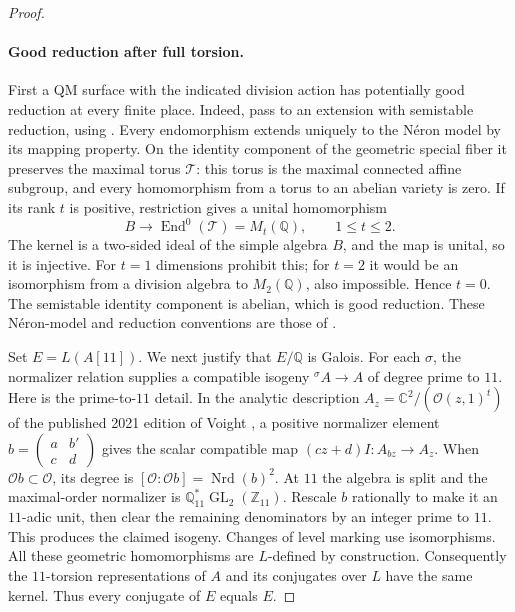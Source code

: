 \begin{proof}
\paragraph{Good reduction after full torsion.}
First a QM surface with the indicated division action has potentially
good reduction at every finite place. Indeed, pass to an extension with
semistable reduction, using \cite[Theorem 3.4, p.~406]{silverbergzarhin}.
Every endomorphism extends uniquely to the N\'eron model by its mapping
property. On the identity component of the geometric special fiber it
preserves the maximal torus $\mathcal T$: this torus is the maximal
connected affine subgroup, and every homomorphism from a torus to an
abelian variety is zero. If its rank $t$ is positive, restriction gives
a unital homomorphism
\[
 B\longrightarrow\operatorname{End}^0(\mathcal T)=M_t(\mathbb Q),
 \qquad 1\le t\le2.
\]
The kernel is a two-sided ideal of the simple algebra $B$, and the map
is unital, so it is injective. For $t=1$ dimensions prohibit this;
for $t=2$ it would be an isomorphism from a division algebra to
$M_2(\mathbb Q)$, also impossible. Hence $t=0$. The semistable identity
component is abelian, which is good reduction. These N\'eron-model and
reduction conventions are those of \cite[\S3, pp.~405--406]{silverbergzarhin}.

Set $E=L(A[11])$. We next justify that $E/\mathbb Q$ is Galois.
For each $\sigma$, the normalizer relation supplies a compatible
isogeny ${}^{\sigma}A\to A$ of degree prime to $11$. Here is the
prime-to-$11$ detail. In the analytic description
$A_z=\mathbb C^2/(\mathcal O(z,1)^t)$ of the published 2021 edition
of Voight \cite[equations (43.1.2)--(43.1.3)]{voight2021}, a positive normalizer element
$b=\left(\begin{smallmatrix}a&b'\\c&d\end{smallmatrix}\right)$
gives the scalar compatible map $(cz+d)I:A_{bz}\to A_z$.
When $\mathcal O b\subset\mathcal O$, its degree is
$[\mathcal O:\mathcal O b]=\operatorname{Nrd}(b)^2$.
At $11$ the algebra is split and the maximal-order normalizer is
$\mathbb Q_{11}^*\operatorname{GL}_2(\mathbb Z_{11})$.
Rescale $b$ rationally to make it an $11$-adic unit, then clear the
remaining denominators by an integer prime to $11$. This produces
the claimed isogeny. Changes of level marking use isomorphisms.
All these geometric homomorphisms are $L$-defined by construction.
Consequently the $11$-torsion representations of $A$ and its conjugates
over $L$ have the same kernel. Thus every conjugate of $E$ equals $E$.


\end{proof}
